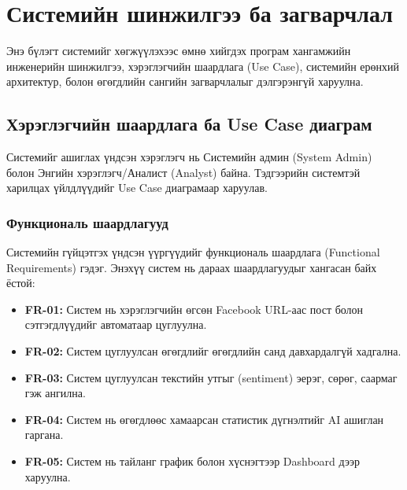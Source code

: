 \chapter{Системийн шинжилгээ ба загварчлал}
\label{Chapter3}

Энэ бүлэгт системийг хөгжүүлэхээс өмнө хийгдэх програм хангамжийн инженерийн шинжилгээ, хэрэглэгчийн шаардлага (Use Case), системийн ерөнхий архитектур, болон өгөгдлийн сангийн загварчлалыг дэлгэрэнгүй харуулна.

\section{Хэрэглэгчийн шаардлага ба Use Case диаграм}

Системийг ашиглах үндсэн хэрэглэгч нь Системийн админ (System Admin) болон Энгийн хэрэглэгч/Аналист (Analyst) байна. Тэдгээрийн системтэй харилцах үйлдлүүдийг Use Case диаграмаар харуулав.

\subsection{Функциональ шаардлагууд}
Системийн гүйцэтгэх үндсэн үүргүүдийг функциональ шаардлага (Functional Requirements) гэдэг. Энэхүү систем нь дараах шаардлагуудыг хангасан байх ёстой:
\begin{itemize}
    \item \textbf{FR-01:} Систем нь хэрэглэгчийн өгсөн Facebook URL-аас пост болон сэтгэгдлүүдийг автоматаар цуглуулна.
    \item \textbf{FR-02:} Систем цуглуулсан өгөгдлийг өгөгдлийн санд давхардалгүй хадгална.
    \item \textbf{FR-03:} Систем цуглуулсан текстийн утгыг (sentiment) эерэг, сөрөг, саармаг гэж ангилна.
    \item \textbf{FR-04:} Систем нь өгөгдлөөс хамаарсан статистик дүгнэлтийг AI ашиглан гаргана.
    \item \textbf{FR-05:} Систем нь тайланг график болон хүснэгтээр Dashboard дээр харуулна.
\end{itemize}

